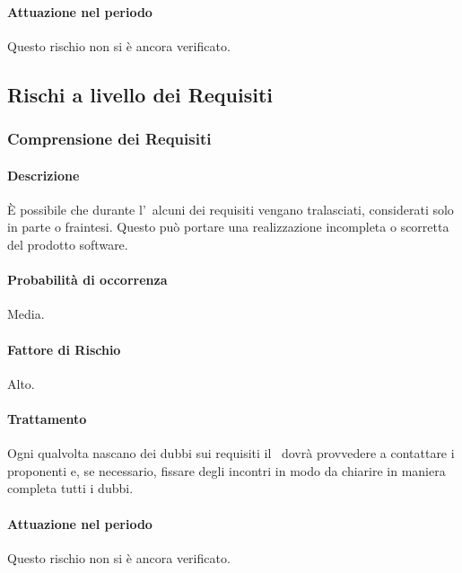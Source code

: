 \paragraph{Attuazione nel periodo}
Questo rischio non si è ancora verificato.

\subsection{Rischi a livello dei Requisiti}
\subsubsection{Comprensione dei Requisiti}
\paragraph{Descrizione}
È possibile che durante l'\AdR\ alcuni dei requisiti vengano tralasciati, considerati solo in parte o fraintesi. Questo può portare una realizzazione incompleta o scorretta del prodotto software.
\paragraph{Probabilità di occorrenza}
Media.
\paragraph{Fattore di Rischio}
Alto.
\paragraph{Trattamento}
Ogni qualvolta nascano dei dubbi sui requisiti il \Pm\ dovrà provvedere a contattare i proponenti e, se necessario, fissare degli incontri in modo da chiarire in maniera completa tutti i dubbi.
\paragraph{Attuazione nel periodo}
Questo rischio non si è ancora verificato.

\newpage
